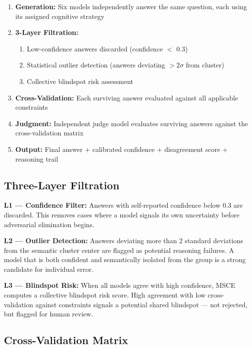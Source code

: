 \documentclass[11pt,a4paper]{article}
\begin{document}
\begin{enumerate}[leftmargin=*]
    \item \textbf{Generation:} Six models independently answer the same question, each using its assigned cognitive strategy
    \item \textbf{3-Layer Filtration:}
    \begin{enumerate}
        \item[L1.] Low-confidence answers discarded (confidence $<$ 0.3)
        \item[L2.] Statistical outlier detection (answers deviating $>2\sigma$ from cluster)
        \item[L3.] Collective blindspot risk assessment
    \end{enumerate}
    \item \textbf{Cross-Validation:} Each surviving answer evaluated against all applicable constraints
    \item \textbf{Judgment:} Independent judge model evaluates surviving answers against the cross-validation matrix
    \item \textbf{Output:} Final answer + calibrated confidence + disagreement score + reasoning trail
\end{enumerate}

\subsection{Three-Layer Filtration}

\textbf{L1 — Confidence Filter:} Answers with self-reported confidence below 0.3 are discarded. This removes cases where a model signals its own uncertainty before adversarial elimination begins.

\textbf{L2 — Outlier Detection:} Answers deviating more than 2 standard deviations from the semantic cluster center are flagged as potential reasoning failures. A model that is both confident and semantically isolated from the group is a strong candidate for individual error.

\textbf{L3 — Blindspot Risk:} When all models agree with high confidence, MSCE computes a collective blindspot risk score. High agreement with low cross-validation against constraints signals a potential shared blindspot — not rejected, but flagged for human review.

\subsection{Cross-Validation Matrix}
\end{document}
